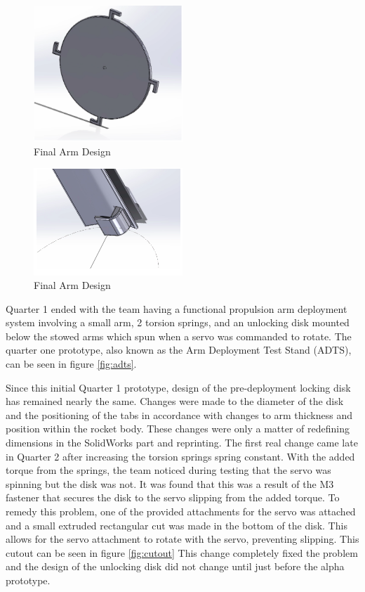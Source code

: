 \begin{figure}[H]
    \centering
    \includegraphics[width=0.5\textwidth]{src/figs/doordisk.png}
    \caption{Final Arm Design}
    \label{fig:diskdoor}
\end{figure}
\begin{figure}[H]
    \centering
    \includegraphics[width=0.5\textwidth]{src/figs/doorlatch.png}
    \caption{Final Arm Design}
    \label{fig:doorlatch}
\end{figure}

Quarter 1 ended with the team having a functional propulsion arm deployment system involving a small arm, 2 torsion springs, and an unlocking disk mounted below the stowed arms which spun when a servo was commanded to rotate. The quarter one prototype, also known as the Arm Deployment Test Stand (ADTS), can be seen in figure \ref{fig:adts}.


Since this initial Quarter 1 prototype, design of the pre-deployment locking disk has remained nearly the same. Changes were made to the diameter of the disk and the positioning of the tabs in accordance with changes to arm thickness and position within the rocket body. These changes were only a matter of redefining dimensions in the SolidWorks part and reprinting. The first real change came late in Quarter 2 after increasing the torsion springs spring constant. With the added torque from the springs, the team noticed during testing that the servo was spinning but the disk was not. It was found that this was a result of the M3 fastener that secures the disk to the servo slipping from the added torque. To remedy this problem, one of the provided attachments for the servo was attached and a small extruded rectangular cut was made in the bottom of the disk. This allows for the servo attachment to rotate with the servo, preventing slipping. This cutout can be seen in figure \ref{fig:cutout} This change completely fixed the problem and the design of the unlocking disk did not change until just before the alpha prototype. 

